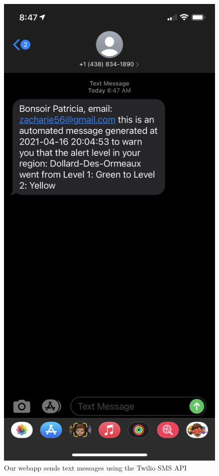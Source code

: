 \begin{figure}[h]
    \centering
    \includegraphics[scale=0.15]{imgs/sms.png}
    \caption{Our webapp sends text messages using the Twilio SMS API}
\end{figure}